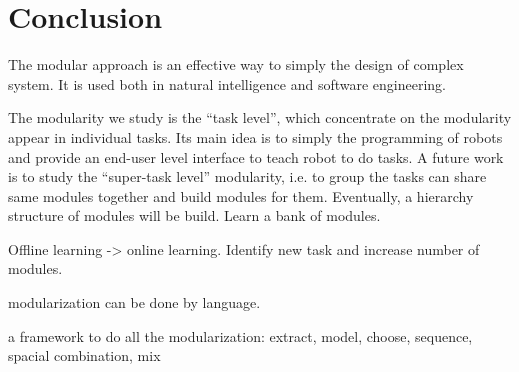 \chapter{Conclusion}
\label{cha6}

The modular approach is an effective way to simply the design of complex system. It is used both in natural intelligence and software engineering.

The modularity we study is the ``task level'', which concentrate on the modularity appear in individual tasks. Its main idea is to simply the programming of robots and provide an end-user level interface to teach robot to do tasks. A future work is to study the ``super-task level'' modularity, i.e. to group the tasks can share same modules together and build modules for them. Eventually, a hierarchy structure of modules will be build. Learn a bank of modules.

Offline learning -> online learning. Identify new task and increase number of modules.

modularization can be done by language. 

a framework to do all the modularization: extract, model, choose, sequence, spacial combination, mix